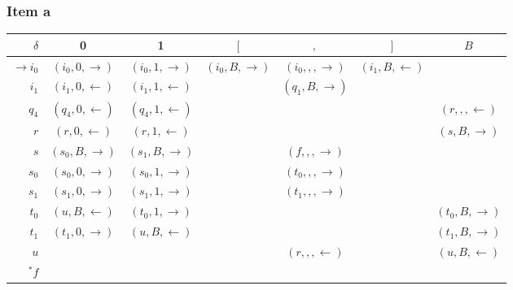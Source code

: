 {\subsubsection{Item a}
\begin{center}
	\begin{tabular}{r | c c c c c c}
		$\delta$          & 0                     & 1                     & $[$                   & $,$                   & $]$                  & $B$ \\ \hline
		$\rightarrow i_0$ & $(i_0,0,\rightarrow)$ & $(i_0,1,\rightarrow)$ & $(i_0,B,\rightarrow)$ & $(i_0,,,\rightarrow)$ & $(i_1,B,\leftarrow)$ &     \\
		$            i_1$ & $(i_1,0,\leftarrow )$ & $(i_1,1,\leftarrow )$ &                       & $(q_1,B,\rightarrow)$ &                      &     \\
		$            q_4$ & $(q_4,0,\leftarrow )$ & $(q_4,1,\leftarrow )$ &                       &                       &                      & $(r  ,,,\leftarrow )$ \\
		$            r  $ & $(r  ,0,\leftarrow )$ & $(r  ,1,\leftarrow )$ &                       &                       &                      & $(s  ,B,\rightarrow)$ \\
		$            s  $ & $(s_0,B,\rightarrow)$ & $(s_1,B,\rightarrow)$ &                       & $(f  ,,,\rightarrow)$ &                      &     \\
		$            s_0$ & $(s_0,0,\rightarrow)$ & $(s_0,1,\rightarrow)$ &                       & $(t_0,,,\rightarrow)$ &                      &     \\
		$            s_1$ & $(s_1,0,\rightarrow)$ & $(s_1,1,\rightarrow)$ &                       & $(t_1,,,\rightarrow)$ &                      &     \\
		$            t_0$ & $(u  ,B,\leftarrow )$ & $(t_0,1,\rightarrow)$ &                       &                       &                      & $(t_0,B,\rightarrow)$ \\
		$            t_1$ & $(t_1,0,\rightarrow)$ & $(u  ,B,\leftarrow )$ &                       &                       &                      & $(t_1,B,\rightarrow)$ \\
		$            u  $ &                       &                       &                       & $(r  ,,,\leftarrow )$ &                      & $(u,B,\leftarrow)$ \\
		$         ^* f  $ &                       &                       &                       &                       &                      &

\end{tabular}
\end{center}}
